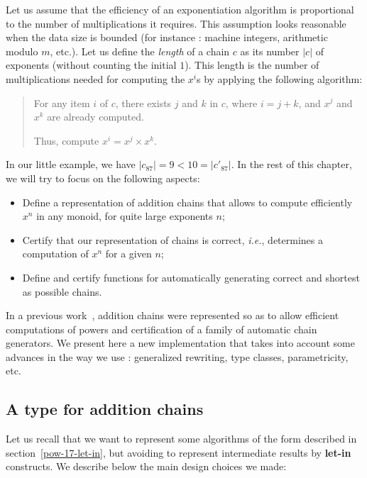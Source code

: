 Let us assume that the efficiency of an exponentiation algorithm is proportional
to the number of multiplications it requires. This assumption looks reasonable 
when the data size is bounded (for instance : machine integers, arithmetic modulo $m$, etc.). 
Let us define the \emph{length} of a chain $c$ as its number $|c|$ of exponents
(without counting the initial $1$). 
This length is the number of multiplications needed for 
computing the $x^i$s by applying the following algorithm:

\begin{quote}
For any item $i$ of $c$, there exists $j$ and $k$ in $c$, where
$i=j+k$, and $x^j$ and $x^k$ are already computed.

Thus, compute $x^i = x^j \times x^k$.
\end{quote}

In our little example, we have 
$|c_{87}| = 9 < 10 = |c'_{87}|$. 
In the rest of this chapter, we will try to focus on the following aspects:
\begin{itemize}
\item Define a representation of addition chains that allows to compute
  efficiently $x^n$ in any monoid, for quite large exponents $n$;
\item Certify that our representation of chains is correct, 
    \emph{i.e.}, determines a computation of $x^n$ for a given $n$;
\item Define and certify functions for automatically  generating 
    correct and shortest as possible chains.
\end{itemize}

In a previous work~\cite{DBLP:journals/ita/BrlekCHM95, DBLP:conf/tapsoft/BrlekCS91,AdditionsContrib},  addition chains were represented so as to allow
efficient computations of powers and certification of a family of
automatic chain generators.
  We present here a new implementation that takes into account some
advances in the way we use \coq{}: generalized rewriting, type classes,
parametricity, etc.


\subsection{A type for addition chains}

Let us recall that we want to represent some algorithms of the form
described in section~\ref{pow-17-let-in}, but avoiding to represent
intermediate results by \textbf{let-in}  constructs.
We describe below the main design choices we made:

